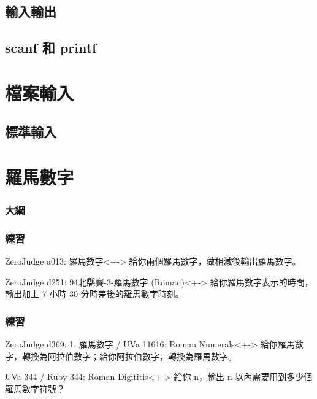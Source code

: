 \documentclass[utf8]{beamer}
\begin{document}
\begin{CJK}{UTF8}{bkai}
\subsection{輸入輸出}

\subsection{scanf 和 printf}

\section{檔案輸入}

\subsection{標準輸入}

\section{羅馬數字}
\begin{frame}
  \frametitle{大綱}
  \begin{multicols}{2}
    \tableofcontents[currentsection]
  \end{multicols}
\end{frame}

\begin{frame}[fragile]
  \frametitle{練習}
  \begin{exampleblock}{ZeroJudge a013: 羅馬數字}<+->
  給你兩個羅馬數字，做相減後輸出羅馬數字。
  \end{exampleblock}
  \begin{exampleblock}{ZeroJudge d251: 94北縣賽-3-羅馬數字 (Roman)}<+->
  給你羅馬數字表示的時間，輸出加上 7 小時 30 分時差後的羅馬數字時刻。
  \end{exampleblock}
\end{frame}

\begin{frame}[fragile]
  \frametitle{練習}
  \begin{exampleblock}{ZeroJudge d369: 1. 羅馬數字 / UVa 11616: Roman Numerals}<+->
  給你羅馬數字，轉換為阿拉伯數字；給你阿拉伯數字，轉換為羅馬數字。
  \end{exampleblock}
  \begin{exampleblock}{UVa 344 / Ruby 344: Roman Digititis}<+->
  給你 n，輸出 n 以內需要用到多少個羅馬數字符號？
  \end{exampleblock}
\end{frame}


\end{CJK}
\end{document}
